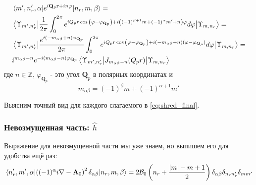 \documentclass[a4paper,article,14pt]{extarticle}
\begin{document}
\begin{equation}
\label{eq:matrix_elem_k}
\begin{aligned}
&\mel{m', n'_r, \alpha} {e^{i \mathbf{Q}_p\mathbf{r} + i n \varphi} } {n_r,m, \beta} = \\ &\mel{\Upsilon_{m', n'_r}} {\frac{1}{2 \pi}\int _{0}^{ 2 \pi } e^{i Q_p r \cos{\left( \varphi - \varphi_{\mathbf{Q}_p}  \right)} + i \left((-1)^{\beta+1}m + (-1)^{\alpha} m'  + n \right)  \varphi}    d\varphi} {\Upsilon_{m, n_r}} =  \\
& \mel{\Upsilon_{m', n'_r}} {\frac{  e^{i \left(-m_{\alpha \beta}  + n \right)  \varphi_{\mathbf{Q}_p}}}{2 \pi}\int _{0}^{ 2 \pi } e^{i Q_p r \cos{\left( \varphi - \varphi_{\mathbf{Q}_p}  \right)} + i \left(-m_{\alpha \beta}  + n \right)  (\varphi-\varphi_{\mathbf{Q}_p}) }    d\varphi} {\Upsilon_{m, n_r}} =\\
& i^{m_{\alpha \beta} - n} e^{-i (m_{\alpha \beta} - n)  \varphi_{\mathbf{Q}_p}}  \mel{\Upsilon_{m', n'_r}} {J_{m_{\alpha \beta} - n } (Q_p r) }{\Upsilon_{m, n_r}}
\end{aligned}
\end{equation}
где $n \in\mathbb{Z}$, $\varphi_{\mathbf{Q}_p}$ - это угол $\mathbf{Q}_p$ в полярных координатах и 
\begin{equation}
\label{eq:m_alpha_beta}
m_{\alpha \beta} = (-1)^{\beta}m + (-1)^{\alpha+1} m'
\end{equation}


Выясним точный вид для каждого слагаемого в \eqref{eq:shred_final}. 

\subsubsection{Невозмущенная часть: $\hat h$}
Выражение для невозмущенной части мы уже знаем, но выпишем его для удобства ещё раз:
\begin{equation}
\mel{n'_r, m', \alpha} {\left((-1)^\alpha i \nabla - \mathbf{A}_0 \right) ^ 2 \delta_{\alpha \beta}} {n_r, m, \beta} = 
2 {\cal B}_{0} \left( n_r + \frac{|m| - m + 1}{2} \right) \delta_{\alpha \beta} \delta_{n_r n'_r} \delta_{m m'} 
\end{equation}
\end{document}
